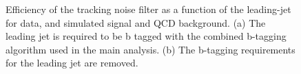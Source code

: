 \begin{figure}[!htb]
\centering
{}
\caption{Efficiency of the tracking noise filter as a function of the leading-jet \pt for data, and simulated signal and QCD background.
(a) The leading jet is required to be b tagged with the combined b-tagging algorithm used in the main analysis. (b) The b-tagging requirements for the leading jet are removed.}
\label{fig:eff-filters-eta}
\end{figure}


